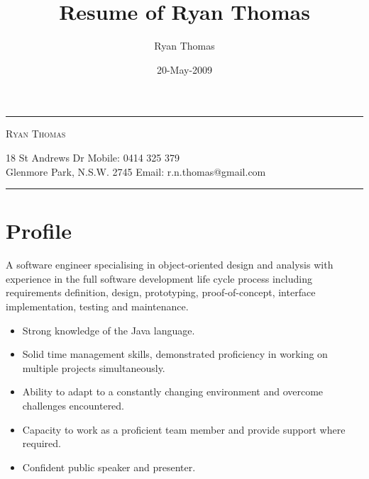 \documentclass[a4paper]{article}
\author{Ryan Thomas}
\title{Resume of Ryan Thomas}
\date{20-May-2009}
\begin{document}
\newcommand{\ryanHeader}{
\begin{center}
\rule{14.1cm}{0.5mm}
\end{center}
\vspace{-0.6cm}
\begin{center}
\textsc{Ryan Thomas}
\end{center}
\vspace{-0.3cm}
18 St Andrews Dr\hspace{7.8cm} Mobile: 0414 325 379\\
Glenmore Park, N.S.W. 2745 \hspace{4.7cm} Email: r.n.thomas@gmail.com
\vspace{-0.3cm}
\begin{center}
\rule{14.1cm}{0.5mm}
\end{center}}

\ryanHeader

\section*{Profile}
A software engineer specialising in object-oriented design and analysis with experience in the full software development life cycle process including requirements definition, design, prototyping, proof-of-concept, interface implementation, testing and maintenance.
\begin{itemize}
\item Strong knowledge of the Java language.
\item Solid time management skills, demonstrated proficiency in working on multiple projects simultaneously.
\item Ability to adapt to a constantly changing environment and overcome challenges encountered.
\item Capacity to work as a proficient team member and provide support where required.
\item Confident public speaker and presenter.
\end{itemize}
\end{document}
